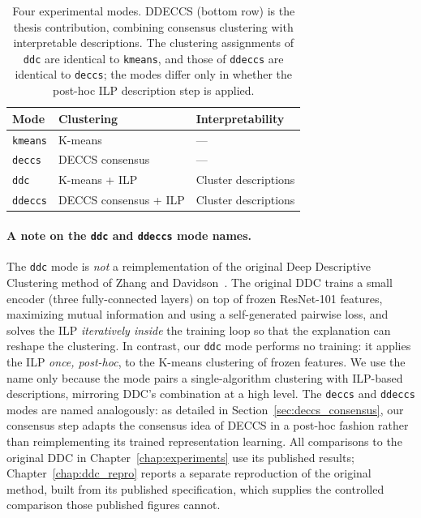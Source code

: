 \begin{table}[H]
    \centering
    \begin{tabular}{lll}
        \hline
        \textbf{Mode} & \textbf{Clustering} & \textbf{Interpretability} \\
        \hline
        \texttt{kmeans} & K-means & --- \\
        \texttt{deccs} & DECCS consensus & --- \\
        \texttt{ddc} & K-means + ILP & Cluster descriptions \\
        \texttt{ddeccs} & DECCS consensus + ILP & Cluster descriptions \\
        \hline
    \end{tabular}
    \caption{Four experimental modes. DDECCS (bottom row) is the thesis contribution, combining consensus clustering with interpretable descriptions. The clustering assignments of \texttt{ddc} are identical to \texttt{kmeans}, and those of \texttt{ddeccs} are identical to \texttt{deccs}; the modes differ only in whether the post-hoc ILP description step is applied.}
    \label{tab:modes}
\end{table}

\paragraph{A note on the \texttt{ddc} and \texttt{ddeccs} mode names.} The \texttt{ddc} mode is \emph{not} a reimplementation of the original Deep Descriptive Clustering method of Zhang and Davidson~\citep{Zhang2021}. The original DDC trains a small encoder (three fully-connected layers) on top of frozen ResNet-101 features, maximizing mutual information and using a self-generated pairwise loss, and solves the ILP \emph{iteratively inside} the training loop so that the explanation can reshape the clustering. In contrast, our \texttt{ddc} mode performs no training: it applies the ILP \emph{once, post-hoc}, to the K-means clustering of frozen features. We use the name only because the mode pairs a single-algorithm clustering with ILP-based descriptions, mirroring DDC's combination at a high level. The \texttt{deccs} and \texttt{ddeccs} modes are named analogously: as detailed in Section~\ref{sec:deccs_consensus}, our consensus step adapts the consensus idea of DECCS in a post-hoc fashion rather than reimplementing its trained representation learning. All comparisons to the original DDC in Chapter~\ref{chap:experiments} use its published results; Chapter~\ref{chap:ddc_repro} reports a separate reproduction of the original method, built from its published specification, which supplies the controlled comparison those published figures cannot.

